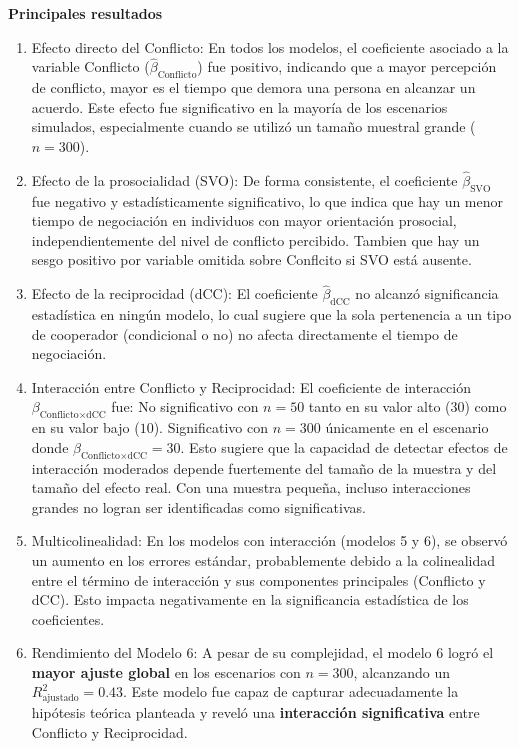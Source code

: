 \documentclass[
  spanish,
  10pt,
]{article}
\begin{document}
\textbf{Principales resultados}

\begin{enumerate}
\def\labelenumi{\arabic{enumi}.}
\item
  Efecto directo del Conflicto: En todos los modelos, el coeficiente
  asociado a la variable Conflicto (\(\hat\beta_{\text{Conflicto}}\))
  fue positivo, indicando que a mayor percepción de conflicto, mayor es
  el tiempo que demora una persona en alcanzar un acuerdo. Este efecto
  fue significativo en la mayoría de los escenarios simulados,
  especialmente cuando se utilizó un tamaño muestral grande
  (\(n = 300\)).
\item
  Efecto de la prosocialidad (SVO): De forma consistente, el coeficiente
  \(\hat\beta_{\text{SVO}}\) fue negativo y estadísticamente
  significativo, lo que indica que hay un menor tiempo de negociación en
  individuos con mayor orientación prosocial, independientemente del
  nivel de conflicto percibido. Tambien que hay un sesgo positivo por
  variable omitida sobre Conflcito si SVO está ausente.
\item
  Efecto de la reciprocidad (dCC): El coeficiente
  \(\hat\beta_{\text{dCC}}\) no alcanzó significancia estadística en
  ningún modelo, lo cual sugiere que la sola pertenencia a un tipo de
  cooperador (condicional o no) no afecta directamente el tiempo de
  negociación.
\item
  Interacción entre Conflicto y Reciprocidad: El coeficiente de
  interacción \(\beta_{\text{Conflicto} \times \text{dCC}}\) fue: No
  significativo con \(n = 50\) tanto en su valor alto (\(30\)) como en
  su valor bajo (\(10\)). Significativo con \(n = 300\) únicamente en el
  escenario donde \(\beta_{\text{Conflicto} \times \text{dCC}} = 30\).
  Esto sugiere que la capacidad de detectar efectos de interacción
  moderados depende fuertemente del tamaño de la muestra y del tamaño
  del efecto real. Con una muestra pequeña, incluso interacciones
  grandes no logran ser identificadas como significativas.
\item
  Multicolinealidad: En los modelos con interacción (modelos 5 y 6), se
  observó un aumento en los errores estándar, probablemente debido a la
  colinealidad entre el término de interacción y sus componentes
  principales (Conflicto y dCC). Esto impacta negativamente en la
  significancia estadística de los coeficientes.
\item
  Rendimiento del Modelo 6: A pesar de su complejidad, el modelo 6 logró
  el \textbf{mayor ajuste global} en los escenarios con \(n = 300\),
  alcanzando un \(R^2_{\text{ajustado}} = 0.43\). Este modelo fue capaz
  de capturar adecuadamente la hipótesis teórica planteada y reveló una
  \textbf{interacción significativa} entre Conflicto y Reciprocidad.
\end{enumerate}
\end{document}

